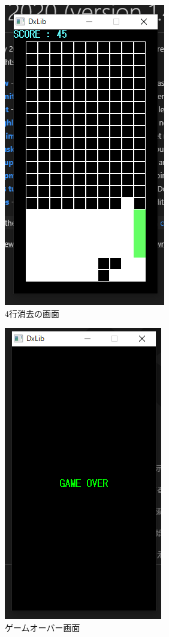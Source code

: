 \begin{figure}[htb]
  \begin{center}
    \includegraphics[scale=0.5]{./soft_img/tetoris.png}
    \caption{4行消去の画面}
    \label{tetoris}
  \end{center}
\end{figure}
\begin{figure}[htb]
  \begin{center}
    \includegraphics[scale=0.5]{./soft_img/gameover.png}
    \caption{ゲームオーバー画面}
    \label{gameover}
  \end{center}
\end{figure}
